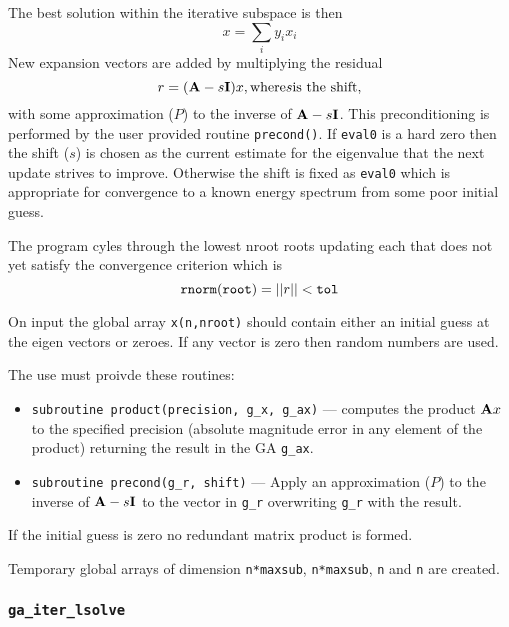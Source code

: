 The best solution within the iterative subspace is then
\begin{displaymath}
  x = \sum_i y_i x_i
\end{displaymath}
New expansion vectors are added by multiplying the residual
\begin{displaymath}
  r = ({\bf A} - s {\bf I}) x, \mbox{where} s \mbox{is the shift},
\end{displaymath}
with some approximation ($P$) to the inverse of ${\bf A}-s{\bf I}$.
This preconditioning is performed by the user provided routine
\verb+precond()+.  If \verb+eval0+ is a hard zero then the shift ($s$) is
chosen as the current estimate for the eigenvalue that the next update
strives to improve.  Otherwise the shift is fixed as \verb+eval0+
which is appropriate for convergence to a known energy spectrum from
some poor initial guess.
     
  The program cyles through the lowest nroot roots updating each that
does not yet satisfy the convergence criterion which is
\begin{displaymath}
   {\tt rnorm(root)} = ||r|| < {\tt tol}
\end{displaymath}

 On input the global array \verb+x(n,nroot)+ should contain either an
initial guess at the eigen vectors or zeroes.  If any vector is zero
then random numbers are used.

The use must proivde these routines:
\begin{itemize}
\item \verb+subroutine product(precision, g_x, g_ax)+ ---
     computes the product ${\bf A}x$ to the specified precision (absolute
     magnitude error in any element of the product) returning the result
     in the GA \verb+g_ax+.
\item \verb+subroutine precond(g_r, shift)+ ---
     Apply an approximation ($P$) to the inverse of ${\bf A} - s {\bf
     I}$ to the vector in \verb+g_r+ overwriting \verb+g_r+ with the result.
\end{itemize}
     
If the initial guess is zero no redundant matrix product is formed.
    
Temporary global arrays of dimension \verb+n*maxsub+, \verb+n*maxsub+, 
\verb+n+ and \verb+n+ are created.


\subsubsection{{\tt ga\_iter\_lsolve}}

